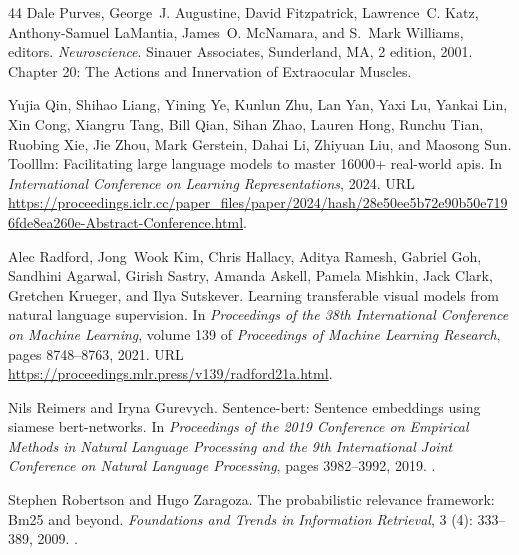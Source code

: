 \begin{thebibliography}{44}
Dale Purves, George~J. Augustine, David Fitzpatrick, Lawrence~C. Katz,
  Anthony-Samuel LaMantia, James~O. McNamara, and S.~Mark Williams, editors.
\newblock \emph{Neuroscience}.
\newblock Sinauer Associates, Sunderland, MA, 2 edition, 2001.
\newblock Chapter 20: The Actions and Innervation of Extraocular Muscles.

Yujia Qin, Shihao Liang, Yining Ye, Kunlun Zhu, Lan Yan, Yaxi Lu, Yankai Lin,
  Xin Cong, Xiangru Tang, Bill Qian, Sihan Zhao, Lauren Hong, Runchu Tian,
  Ruobing Xie, Jie Zhou, Mark Gerstein, Dahai Li, Zhiyuan Liu, and Maosong Sun.
\newblock Toolllm: Facilitating large language models to master 16000+
  real-world apis.
\newblock In \emph{International Conference on Learning Representations}, 2024.
\newblock URL
  \url{https://proceedings.iclr.cc/paper_files/paper/2024/hash/28e50ee5b72e90b50e7196fde8ea260e-Abstract-Conference.html}.

Alec Radford, Jong~Wook Kim, Chris Hallacy, Aditya Ramesh, Gabriel Goh,
  Sandhini Agarwal, Girish Sastry, Amanda Askell, Pamela Mishkin, Jack Clark,
  Gretchen Krueger, and Ilya Sutskever.
\newblock Learning transferable visual models from natural language
  supervision.
\newblock In \emph{Proceedings of the 38th International Conference on Machine
  Learning}, volume 139 of \emph{Proceedings of Machine Learning Research},
  pages 8748--8763, 2021.
\newblock URL \url{https://proceedings.mlr.press/v139/radford21a.html}.

Nils Reimers and Iryna Gurevych.
\newblock Sentence-bert: Sentence embeddings using siamese bert-networks.
\newblock In \emph{Proceedings of the 2019 Conference on Empirical Methods in
  Natural Language Processing and the 9th International Joint Conference on
  Natural Language Processing}, pages 3982--3992, 2019.
\newblock {}.

Stephen Robertson and Hugo Zaragoza.
\newblock The probabilistic relevance framework: Bm25 and beyond.
\newblock \emph{Foundations and Trends in Information Retrieval}, 3
  (4): 333--389, 2009.
\newblock {}.


\end{thebibliography}

